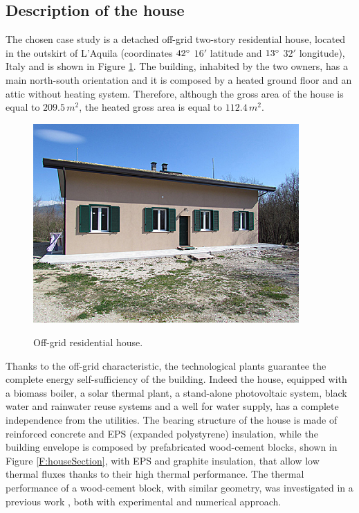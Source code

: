 \subsection{Description of the house}\label{SS:descriptionHouse}
The chosen case study is a detached off-grid two-story residential house, located in the outskirt of L'Aquila (coordinates $42\degree$ $16'$ latitude and $13\degree$ $32'$ longitude), Italy and is shown in Figure \ref{F:house}. The building, inhabited by the two owners, has a main north-south orientation and it is composed by a heated ground floor and an attic without heating system. Therefore, although the gross area of the house is equal to $209.5\,m^2$, the heated gross area is equal to $112.4\,m^2$. 


\begin{figure}[h!]
	\begin{center}
		\includegraphics[width=24pc]{figures/Vista_sud.eps}
		\caption{Off-grid residential house.}
		\captionsetup{justification=centering}
		\label{F:house}
	\end{center}
\end{figure}

Thanks to the off-grid characteristic, the technological plants guarantee the complete energy self-sufficiency of the building. Indeed the house, equipped with a biomass boiler, a solar thermal plant, a stand-alone photovoltaic system, black water and rainwater reuse systems and a well for water supply, has a complete independence from the utilities.   
The bearing structure of the house is made of reinforced concrete and EPS (expanded polystyrene) insulation, while the building envelope is composed by prefabricated wood-cement blocks, shown in Figure \ref{F:houseSection}, with EPS and graphite insulation, that allow low thermal fluxes thanks to their high thermal performance. The thermal performance of a wood-cement block, with similar geometry, was investigated in a previous work \cite{Nardi2016}, both with experimental and numerical approach.

